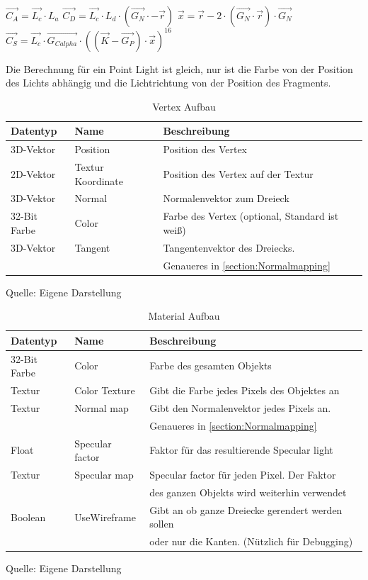 	$\overrightarrow{C_{A}} = \overrightarrow{L_{c}} \cdot L_{a}$\newline
$\overrightarrow{C_{D}} = \overrightarrow{L_{c}} \cdot L_{d} \cdot (\overrightarrow{G_{N}} \cdot -\overrightarrow{r})$\newline
$\overrightarrow{x} = \overrightarrow{r} - 2 \cdot (\overrightarrow{G_{N}} \cdot \overrightarrow{r}) \cdot \overrightarrow{G_{N}}$\newline
$\overrightarrow{C_{S}} = \overrightarrow{L_{c}} \cdot \overrightarrow{G_{C alpha}} \cdot ((\overrightarrow{K} - \overrightarrow{G_{P}}) \cdot \overrightarrow{x})^{16}$
	
Die  Berechnung für ein Point Light ist gleich, nur ist die Farbe von der Position des Lichts abhängig und die Lichtrichtung von der Position des Fragments.

\begin{table}
	\caption{Vertex Aufbau}
	\label{table:VertexAufbau}
	\centering
	\begin{tabular}{lll}\toprule[1.5pt]
		Datentyp & Name & Beschreibung \\\midrule
		3D-Vektor & Position & Position des Vertex \\
		2D-Vektor & Textur Koordinate & Position des Vertex auf der Textur \\
		3D-Vektor & Normal & Normalenvektor zum Dreieck \\
		32-Bit Farbe & Color & Farbe des Vertex (optional, Standard ist weiß) \\
		3D-Vektor & Tangent & Tangentenvektor des Dreiecks. \\
		 & & Genaueres in \cref{section:Normalmapping}\\\bottomrule[1.5pt]
	\end{tabular}
	Quelle: Eigene Darstellung
\end{table}
\begin{table}
	\caption{Material Aufbau}
	\centering
	\begin{tabular}{lll}\toprule[1.5pt]
	Datentyp & Name & Beschreibung \\\midrule
	32-Bit Farbe & Color & Farbe des gesamten Objekts \\
	Textur & Color Texture & Gibt die Farbe jedes Pixels des Objektes an \\
	Textur & Normal map & Gibt den Normalenvektor jedes Pixels an. \\
	 & & Genaueres in \cref{section:Normalmapping} \\
	Float & Specular factor & Faktor für das resultierende Specular light \\
	Textur & Specular map & Specular factor für jeden Pixel. Der Faktor \\
	 & & des ganzen Objekts wird weiterhin verwendet \\
	 Boolean & UseWireframe & Gibt an ob ganze Dreiecke gerendert werden sollen\\
	  & & oder nur die Kanten. (Nützlich für Debugging)\\\bottomrule[1.5pt]
\end{tabular}
	Quelle: Eigene Darstellung
\end{table}


